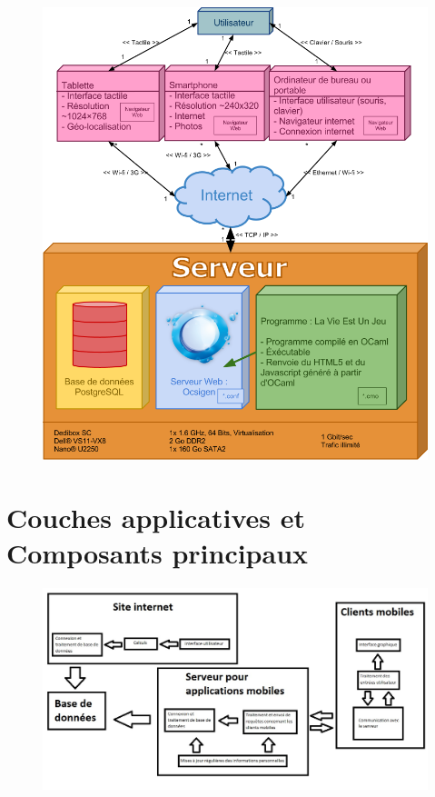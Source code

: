 \documentclass{life-fr}
\begin{document}
\begin{figure}[H]
  \begin{center}
    \includegraphics[width=17cm]{img/deploiement.png}
  \end{center}
\end{figure}



\chapter{Couches applicatives et Composants principaux}

\begin{figure}[H]
  \begin{center}
    \includegraphics[width=11.5cm]{img/couches_application.png}
  \end{center}
\end{figure}
\end{document}
